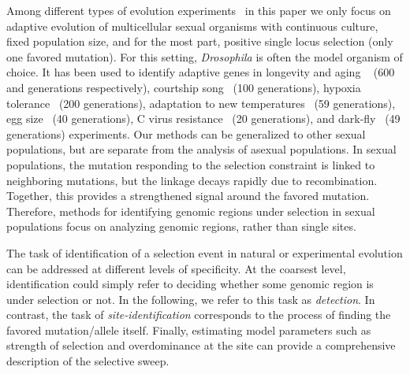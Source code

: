 \documentclass[11pt]{article}
\begin{document}
Among different types of evolution experiments~\cite{Barrick2013Genome,schlotterer2015combining} in this paper we
only focus on adaptive evolution of multicellular sexual organisms
with continuous culture, fixed population size, and for the most part,
positive single locus selection (only one favored mutation).  For this
setting, \emph{Drosophila} is often the model organism of choice. It
has been used to identify adaptive genes in longevity and aging
~\cite{burke2010genome,remolina2012genomic} (600 and generations
respectively), courtship song~\cite{turner2011population} (100
generations), hypoxia tolerance~\cite{zhou2011experimental} (200
generations), adaptation to new
temperatures~\cite{orozco2012adaptation,tobler2014massive} (59
generations), egg size~\cite{jha2015whole} (40 generations), C virus
resistance~\cite{martins2014host} (20 generations), and
dark-fly~\cite{izutsu2015dynamics} (49 generations) experiments. Our
methods can be generalized to other sexual populations, but are
separate from the analysis of asexual populations. In sexual
populations, the mutation responding to the selection constraint is
linked to neighboring mutations, but the linkage decays rapidly due to
recombination. Together, this provides a strengthened signal around
the favored mutation. Therefore, methods for identifying genomic
regions under selection in sexual populations focus on analyzing
genomic regions, rather than single sites.

The task of identification of a selection event in natural or
experimental evolution can be addressed at different levels of
specificity. At the coarsest level, identification could simply refer
to deciding whether some genomic region is under selection or not.  In
the following, we refer to this task as \emph{detection}. In contrast,
the task of \emph{site-identification} corresponds to the process of
finding the favored mutation/allele itself. Finally, estimating model
parameters such as strength of selection and overdominance at the site
can provide a comprehensive description of the selective sweep.
\end{document}
